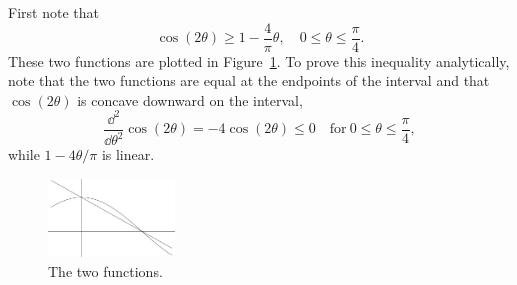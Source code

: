 {%
\begin{Solution}
  \label{solution cos x^2}
  First note that 
  \[
  \cos(2 \theta) \geq 1 - \frac{4}{\pi} \theta, 
  \quad 0 \leq \theta \leq \frac{\pi}{4}.
  \]
  These two functions are plotted in Figure~\ref{bndcos2t}.
  To prove this inequality analytically, note that the two functions are 
  equal at the endpoints of the interval and that $\cos(2 \theta)$ is concave 
  downward on the interval,
  \[
  \frac{\dd^2}{\dd \theta^2} \cos(2 \theta) = - 4 \cos(2 \theta) \leq 0 \quad 
  \mathrm{for}\ 0 \leq \theta \leq \frac{\pi}{4},
  \]
  while $1 - 4 \theta / \pi$ is linear.

  \begin{figure}[tb!]
    \begin{center}
      \includegraphics[width=0.3\textwidth]{fcv/residue/bndcos2t}
    \end{center}
    \caption{The two functions.}
    \label{bndcos2t}
  \end{figure}


\end{Solution}}
